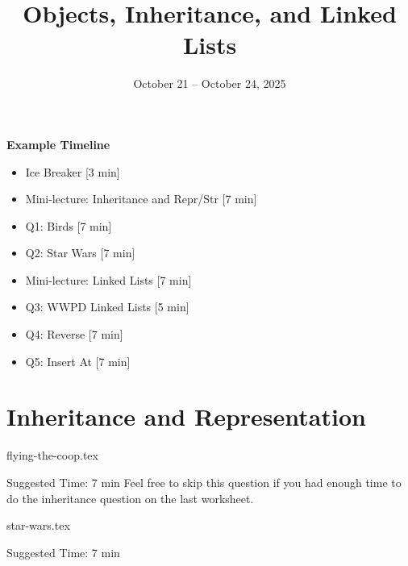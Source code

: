 \documentclass{exam}
\title{Objects, Inheritance, and Linked Lists}
\date{October 21 -- October 24, 2025}
\begin{document}
\maketitle

\begin{meta}
    \textbf{Example Timeline}
    \begin{itemize}
        \item Ice Breaker [3 min]
        \item Mini-lecture: Inheritance and Repr/Str [7 min]
        \item Q1: Birds [7 min]
        \item Q2: Star Wars [7 min] 
        \item Mini-lecture: Linked Lists [7 min]
        \item Q3: WWPD Linked Lists [5 min]
        \item Q4: Reverse [7 min]
        \item Q5: Insert At [7 min]
    \end{itemize}

\end{meta}

\section{Inheritance and Representation}
\begin{questions}
    {flying-the-coop.tex}
    \begin{questionmeta}
        Suggested Time: 7 min
        Feel free to skip this question if you had enough time to do the inheritance question on the last worksheet.
    \end{questionmeta}

    {star-wars.tex}
    \begin{questionmeta}
        Suggested Time: 7 min
    \end{questionmeta}

\end{questions}
\end{document}

